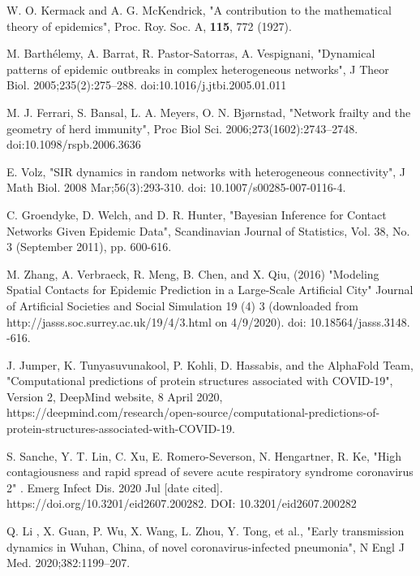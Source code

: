 \documentclass[aps,preprint]{revtex4}
\begin{document}
\begin{thebibliography}{99}

W. O. Kermack and A. G. McKendrick, "A contribution to the mathematical theory of epidemics",  Proc. Roy. Soc. A, {\bf 115}, 772 (1927).

M. Barthélemy, A. Barrat, R. Pastor-Satorras, A. Vespignani, "Dynamical patterns of epidemic outbreaks in complex heterogeneous networks", J Theor Biol. 2005;235(2):275–288. doi:10.1016/j.jtbi.2005.01.011

M. J. Ferrari, S. Bansal, L. A. Meyers, O. N. Bjørnstad, "Network frailty and the geometry of herd immunity", Proc Biol Sci. 2006;273(1602):2743–2748. doi:10.1098/rspb.2006.3636

E. Volz, "SIR dynamics in random networks with heterogeneous connectivity", J Math Biol. 2008 Mar;56(3):293-310. doi: 10.1007/s00285-007-0116-4.  

C. Groendyke, D. Welch, and D. R. Hunter, "Bayesian Inference for Contact Networks Given Epidemic Data", Scandinavian Journal of Statistics,
Vol. 38, No. 3 (September 2011), pp. 600-616.

M. Zhang, A. Verbraeck, R. Meng, B. Chen, and X. Qiu, (2016) "Modeling Spatial Contacts for Epidemic Prediction in a Large-Scale Artificial City" Journal of Artificial Societies and Social Simulation 19 (4) 3 (downloaded from http://jasss.soc.surrey.ac.uk/19/4/3.html on 4/9/2020). doi: 10.18564/jasss.3148.
-616.

J. Jumper, K. Tunyasuvunakool, P. Kohli, D. Hassabis, and the AlphaFold Team, "Computational predictions of protein structures associated with COVID-19", Version 2, DeepMind website, 8 April 2020, https://deepmind.com/research/open-source/computational-predictions-of-protein-structures-associated-with-COVID-19.

S. Sanche, Y. T. Lin, C. Xu, E. Romero-Severson, N. Hengartner, R. Ke, "High contagiousness and rapid spread of severe acute respiratory syndrome coronavirus 2" . Emerg Infect Dis. 2020 Jul [date cited]. https://doi.org/10.3201/eid2607.200282. DOI: 10.3201/eid2607.200282

Q. Li , X. Guan, P. Wu, X. Wang, L. Zhou, Y. Tong, et al., "Early transmission dynamics in Wuhan, China, of novel coronavirus-infected pneumonia", N Engl J Med. 2020;382:1199–207. 


\end{thebibliography}
\end{document}
